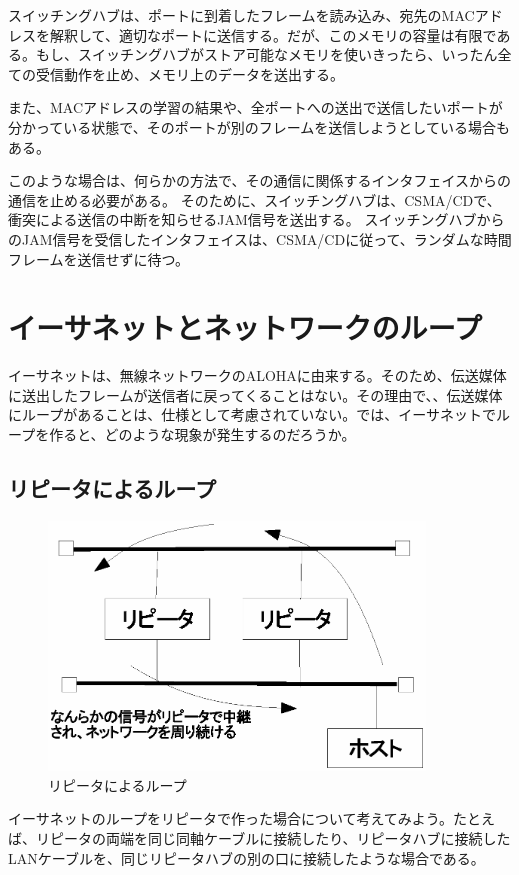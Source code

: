 スイッチングハブは、ポートに到着したフレームを読み込み、宛先のMACアドレスを解釈して、適切なポートに送信する。だが、このメモリの容量は有限である。もし、スイッチングハブがストア可能なメモリを使いきったら、いったん全ての受信動作を止め、メモリ上のデータを送出する。

また、MACアドレスの学習の結果や、全ポートへの送出で送信したいポートが分かっている状態で、そのポートが別のフレームを送信しようとしている場合もある。

このような場合は、何らかの方法で、その通信に関係するインタフェイスからの通信を止める必要がある。
そのために、スイッチングハブは、CSMA/CDで、衝突による送信の中断を知らせるJAM信号を送出する。
スイッチングハブからのJAM信号を受信したインタフェイスは、CSMA/CDに従って、ランダムな時間フレームを送信せずに待つ。

\section{イーサネットとネットワークのループ}

イーサネットは、無線ネットワークのALOHAに由来する。そのため、伝送媒体に送出したフレームが送信者に戻ってくることはない。その理由で、、伝送媒体にループがあることは、仕様として考慮されていない。では、イーサネットでループを作ると、どのような現象が発生するのだろうか。


\subsection{リピータによるループ}


\begin{figure}[htbp]
	\includegraphics[width=10cm,clip]{draw/repeaterloop.eps}
	\caption{リピータによるループ}
	\label{fig:repeaterloop}
\end{figure}

イーサネットのループをリピータで作った場合について考えてみよう。たとえば、リピータの両端を同じ同軸ケーブルに接続したり、リピータハブに接続したLANケーブルを、同じリピータハブの別の口に接続したような場合である。

